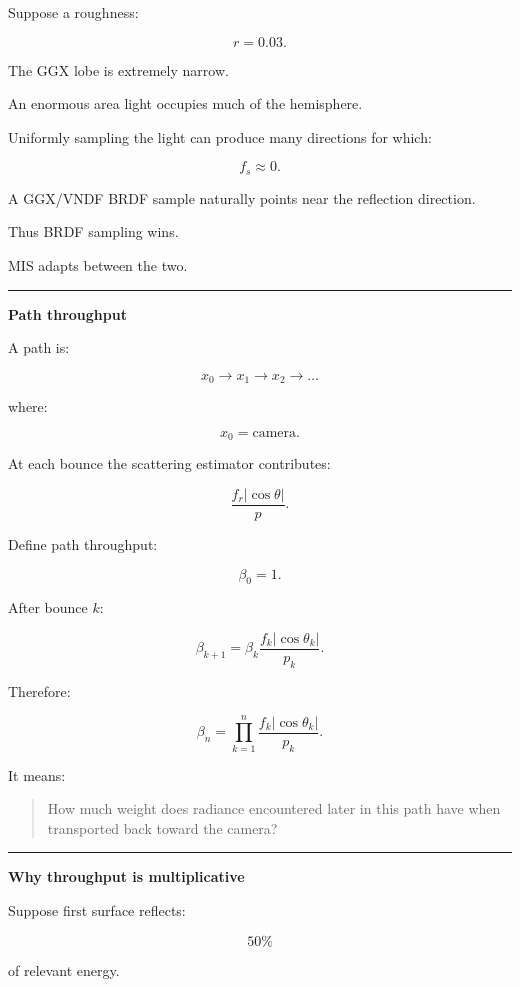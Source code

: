 Suppose a roughness:

\[
r=0.03.
\]

The GGX lobe is extremely narrow.

An enormous area light occupies much of the hemisphere.

Uniformly sampling the light can produce many directions for which:

\[
f_s\approx0.
\]

A GGX/VNDF BRDF sample naturally points near the reflection direction.

Thus BRDF sampling wins.

MIS adapts between the two.

\begin{center}\rule{0.5\linewidth}{0.5pt}\end{center}

\textbf{Path throughput}

A path is:

\[
x_0\rightarrow x_1\rightarrow x_2\rightarrow\dots
\]

where:

\[
x_0=\text{camera}.
\]

At each bounce the scattering estimator contributes:

\[
\frac{
f_r
|\cos\theta|
}{
p
}.
\]

Define path throughput:

\[
\boxed{
\beta_0=1.
}
\]

After bounce \(k\):

\[
\boxed{
\beta_{k+1}
=
\beta_k
\frac{
f_k|\cos\theta_k|
}{
p_k
}.
}
\]

Therefore:

\[
\boxed{
\beta_n
=
\prod_{k=1}^{n}
\frac{
f_k|\cos\theta_k|
}{
p_k
}.
}
\]

It means:

\begin{quote}
How much weight does radiance encountered later in this path have when transported back toward the camera?
\end{quote}

\begin{center}\rule{0.5\linewidth}{0.5pt}\end{center}

\textbf{Why throughput is multiplicative}

Suppose first surface reflects:

\[
50\%
\]

of relevant energy.


